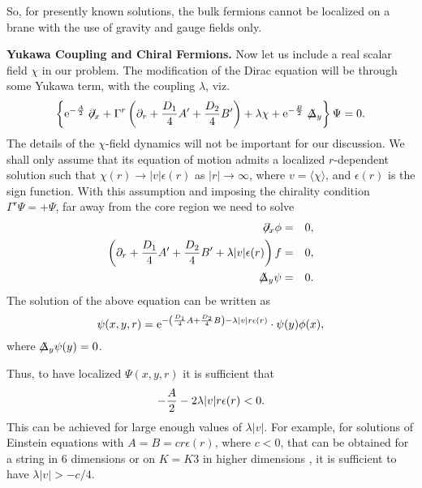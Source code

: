 \documentclass[a4paper,12pt]{article}
\begin{document}
So, for presently known solutions, the bulk fermions cannot be
localized on a brane with the use of gravity and gauge fields only.

{\bf Yukawa Coupling and Chiral Fermions.}
Now let us include a real scalar field $\chi$ in our problem. The
modification of the  Dirac equation will be through some Yukawa term,
with the coupling $\lambda$, viz.
\begin{equation}\label{eq11}
\left\{{\rm e}^{-{A\over 
2}}\not\hspace{-0.1cm}{\partial}_x+\Gamma^r\left(\partial_r+{D_1\over
4}A'+{D_2\over  4}B'\right)+\lambda\chi+{\rm e}^{-{B\over
2}}\not\hspace{-0.1cm}{\Delta}_y\right\}\Psi=0.
\end{equation}
The details of the $\chi$-field dynamics will not be important for our 
discussion. We shall only assume that its equation of motion admits a 
localized $r$-dependent solution such that $\chi(r)\to|v|\epsilon(r)$ as 
$|r|\to\infty$, where $v=\langle\chi\rangle$, and $\epsilon(r)$ is the sign 
function. With this assumption and imposing the chirality condition
$\Gamma^r \Psi = + \Psi$, far away from the core region we need to solve
\begin{eqnarray}
\not\hspace{-0.1cm}{\partial}_x\phi&=&0, \nonumber \\
\left(\partial_r+{D_1\over 4}A'+{D_2\over 
4}B'+\lambda|v|\epsilon(r)\right)f&=&0, \nonumber\\
\not\hspace{-0.1cm}{\Delta}_y\psi&=&0.
\label{eq12}
\end{eqnarray}
The solution of the above equation can 
be written as
\begin{equation}\label{eq13}
\psi(x,y,r)={\rm e}^{-\left({D_1\over 4}A+{D_2\over 4}B\right)-
\lambda|v|r\epsilon(r)}\cdot \psi(y)\phi(x),
\end{equation}
where $\not\hspace{-0.1cm}{\Delta}_y\psi(y)=0$. 

Thus, to have localized $\Psi(x,y,r)$ it is sufficient that
\begin{equation}
\label{eq14}
-{A\over 2}-2\lambda|v|r\epsilon(r)<0.
\end{equation}
This can be achieved for large enough values of $\lambda |v|$. For
example, for solutions of Einstein equations with  $A = B = c r
\epsilon(r)$,  where $c < 0$, that can be obtained for a string in 6
dimensions \cite{gs} or on $K=K3$ in higher dimensions \cite{grs},
it is sufficient to have $\lambda |v|>-c/4$. 
\end{document}

